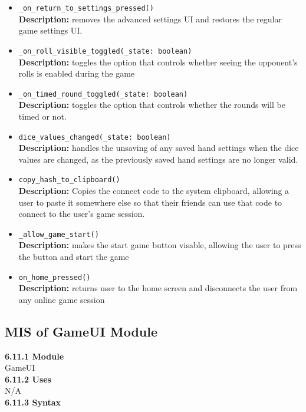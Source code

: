 \documentclass[12pt, titlepage]{article}
\begin{document}
\begin{itemize}
	\item \texttt{\_on\_return\_to\_settings\_pressed() }\\
	\textbf{Description:} removes the advanced settings UI and restores the regular game settings UI.
	\item \texttt{\_on\_roll\_visible\_toggled(\_state: boolean) }\\
	\textbf{Description:} toggles the option that controls whether seeing the opponent's rolls is enabled during the game 
	\item \texttt{\_on\_timed\_round\_toggled(\_state: boolean) }\\
	\textbf{Description:} toggles the option that controls whether the rounds will be timed or not.
	\item \texttt{dice\_values\_changed(\_state: boolean) }\\
	\textbf{Description:} handles the unsaving of any saved hand settings when the dice values are changed, as the previously saved hand settings are no longer valid.
	\item \texttt{copy\_hash\_to\_clipboard() }\\
	\textbf{Description:} Copies the connect code to the system clipboard, allowing a user to paste it somewhere else so that their friends can use that code to connect to the user's game session.
	\item \texttt{\_allow\_game\_start() }\\
	\textbf{Description:} makes the start game button visable, allowing the user to press the button and start the game
	\item \texttt{on\_home\_pressed() }\\
	\textbf{Description:} returns user to the home screen and disconnects the user from any online game session
	 
	
	
\end{itemize}

\subsection{MIS of GameUI Module}\label{GameUI}
\textbf{6.11.1 Module}\\
 GameUI\\

\noindent \textbf{6.11.2 Uses}\\
N/A \\

\noindent \textbf{6.11.3 Syntax}
\end{document}
